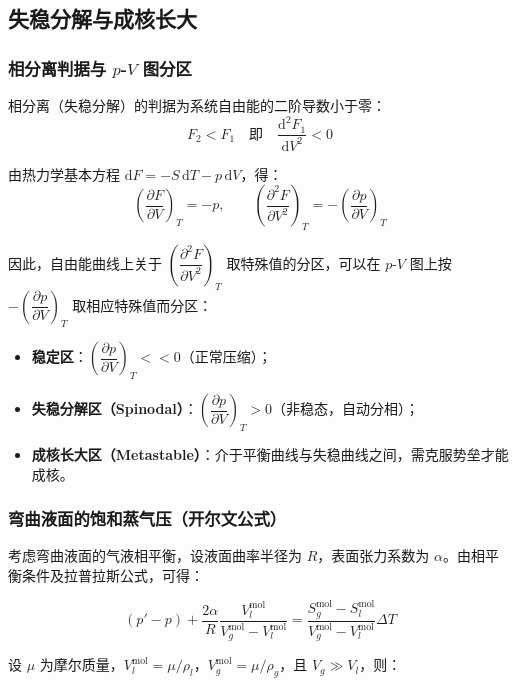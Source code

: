 \documentclass[UTF8]{ctexart}
\begin{document}
\subsection{失稳分解与成核长大}

\subsubsection{相分离判据与 \texorpdfstring{$p$-$V$}{p-V} 图分区}

相分离（失稳分解）的判据为系统自由能的二阶导数小于零：
\[
F_2<F_1\quad\text{即}\quad\frac{\mathrm{d}^2F_1}{\mathrm{d}V^2}<0
\]

由热力学基本方程 $\mathrm{d}F=-S\,\mathrm{d}T-p\,\mathrm{d}V$，得：
\[
\left(\frac{\partial F}{\partial V}\right)_T=-p,\qquad
\left(\frac{\partial^2 F}{\partial V^2}\right)_T
=-\left(\frac{\partial p}{\partial V}\right)_T
\]

因此，自由能曲线上关于 $\left(\dfrac{\partial^2 F}{\partial V^2}\right)_T$ 取特殊值的分区，可以在 $p$-$V$ 图上按 $-\left(\dfrac{\partial p}{\partial V}\right)_T$ 取相应特殊值而分区：

\begin{itemize}[leftmargin=2em]
  \item \textbf{稳定区}：$\left(\dfrac{\partial p}{\partial V}\right)_T<<0$（正常压缩）；
  \item \textbf{失稳分解区（Spinodal）}：$\left(\dfrac{\partial p}{\partial V}\right)_T>0$（非稳态，自动分相）；
  \item \textbf{成核长大区（Metastable）}：介于平衡曲线与失稳曲线之间，需克服势垒才能成核。
\end{itemize}

\subsubsection{弯曲液面的饱和蒸气压（开尔文公式）}

考虑弯曲液面的气液相平衡，设液面曲率半径为 $R$，表面张力系数为 $\alpha$。由相平衡条件及拉普拉斯公式，可得：

\[
(p'-p)+\frac{2\alpha}{R}\frac{V_l^{\mathrm{mol}}}{V_g^{\mathrm{mol}}-V_l^{\mathrm{mol}}}
=\frac{S_g^{\mathrm{mol}}-S_l^{\mathrm{mol}}}{V_g^{\mathrm{mol}}-V_l^{\mathrm{mol}}}\Delta T
\]

设 $\mu$ 为摩尔质量，$V_l^{\mathrm{mol}}=\mu/\rho_l$，$V_g^{\mathrm{mol}}=\mu/\rho_g$，且 $V_g\gg V_l$，则：
\end{document}
